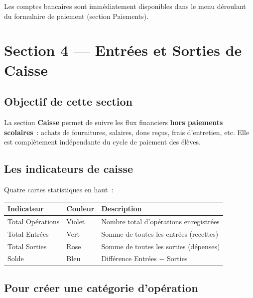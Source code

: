 \begin{resultat}
Les comptes bancaires sont imm\'ediatement disponibles dans le menu d\'eroulant  du formulaire de paiement (section Paiements).
\end{resultat}

\newpage
\chapter{Section 4 --- Entr\'ees et Sorties de Caisse}

\section{Objectif de cette section}

La section \textbf{Caisse} permet de suivre les flux financiers \textbf{hors paiements scolaires}~: achats de fournitures, salaires, dons re\c{c}us, frais d'entretien, etc. Elle est compl\`etement ind\'ependante du cycle de paiement des \'el\`eves.

\section{Les indicateurs de caisse}

Quatre cartes statistiques en haut~:

\begin{center}
\begin{tabularx}{\textwidth}{llX}
\toprule
\textbf{Indicateur} & \textbf{Couleur} & \textbf{Description} \\
\midrule
Total Op\'erations & Violet & Nombre total d'op\'erations enregistr\'ees \\
Total Entr\'ees & Vert & Somme de toutes les entr\'ees (recettes) \\
Total Sorties & Rose & Somme de toutes les sorties (d\'epenses) \\
Solde & Bleu & Diff\'erence Entr\'ees $-$ Sorties \\
\bottomrule
\end{tabularx}
\end{center}

\section{Pour cr\'eer une cat\'egorie d'op\'eration}

